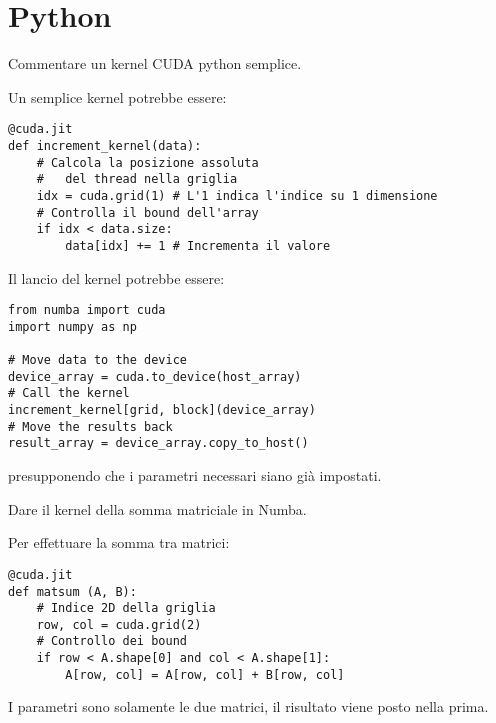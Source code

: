 \section{Python}

\begin{questions}
    \question Commentare un kernel CUDA python semplice.
    
    \begin{solution}
        Un semplice kernel potrebbe essere:
        \begin{verbatim}
@cuda.jit
def increment_kernel(data):
    # Calcola la posizione assoluta
    #   del thread nella griglia
    idx = cuda.grid(1) # L'1 indica l'indice su 1 dimensione
    # Controlla il bound dell'array
    if idx < data.size:
        data[idx] += 1 # Incrementa il valore
        \end{verbatim}
        Il lancio del kernel potrebbe essere:
        \begin{verbatim}
from numba import cuda
import numpy as np

# Move data to the device
device_array = cuda.to_device(host_array)
# Call the kernel
increment_kernel[grid, block](device_array)
# Move the results back
result_array = device_array.copy_to_host()
        \end{verbatim}
        presupponendo che i parametri necessari siano già impostati.
    \end{solution}
    
    \question Dare il kernel della somma matriciale in Numba.
    
    \begin{solution}
        Per effettuare la somma tra matrici:
        \begin{verbatim}
@cuda.jit
def matsum (A, B):
    # Indice 2D della griglia
    row, col = cuda.grid(2)
    # Controllo dei bound
    if row < A.shape[0] and col < A.shape[1]:
        A[row, col] = A[row, col] + B[row, col]
        \end{verbatim}
        I parametri sono solamente le due matrici, il risultato viene posto nella prima.
    \end{solution}
\end{questions}